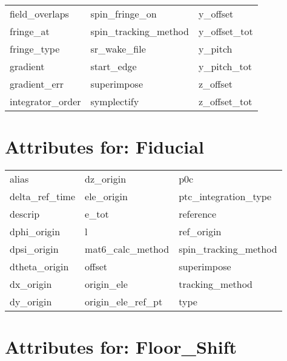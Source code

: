 \begin{tabular}{lll}
field_overlaps              & spin_fringe_on              & y_offset                    \\
fringe_at                   & spin_tracking_method        & y_offset_tot                \\
fringe_type                 & sr_wake_file                & y_pitch                     \\
gradient                    & start_edge                  & y_pitch_tot                 \\
gradient_err                & superimpose                 & z_offset                    \\
integrator_order            & symplectify                 & z_offset_tot                \\
 \bottomrule
 \end{tabular}
 \vfill
 
 \section{Attributes for: Fiducial}
 \label{s:list.fiducial}
 
 \begin{tabular}{lll} \toprule
alias                       & dz_origin                   & p0c                         \\
delta_ref_time              & ele_origin                  & ptc_integration_type        \\
descrip                     & e_tot                       & reference                   \\
dphi_origin                 & l                           & ref_origin                  \\
dpsi_origin                 & mat6_calc_method            & spin_tracking_method        \\
dtheta_origin               & offset                      & superimpose                 \\
dx_origin                   & origin_ele                  & tracking_method             \\
dy_origin                   & origin_ele_ref_pt           & type                        \\
 \bottomrule
 \end{tabular}
 \vfill
 
 \section{Attributes for: Floor_Shift}
 \label{s:list.floor.shift}
 
